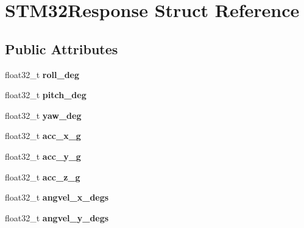 \hypertarget{struct_s_t_m32_response}{}\section{S\+T\+M32\+Response Struct Reference}
\label{struct_s_t_m32_response}
\subsection*{Public Attributes}
\begin{DoxyCompactItemize}
\item 
\mbox{\label{struct_s_t_m32_response_ac444797479ec9155bb8c2dd482b10e08}} 
float32\+\_\+t {\bfseries roll\+\_\+deg}
\item 
\mbox{\label{struct_s_t_m32_response_a7a161dc6f5e1e33a64f2bcd081f414ee}} 
float32\+\_\+t {\bfseries pitch\+\_\+deg}
\item 
\mbox{\label{struct_s_t_m32_response_a795f8edfc89cfc24224761c7ea378faa}} 
float32\+\_\+t {\bfseries yaw\+\_\+deg}
\item 
\mbox{\label{struct_s_t_m32_response_af165e1e563c6d281eb09433c5825c244}} 
float32\+\_\+t {\bfseries acc\+\_\+x\+\_\+g}
\item 
\mbox{\label{struct_s_t_m32_response_aa79868e6f2c7f54d7748dab2ec030eac}} 
float32\+\_\+t {\bfseries acc\+\_\+y\+\_\+g}
\item 
\mbox{\label{struct_s_t_m32_response_aee6c9f7f3ecd514934b262975ca78ac3}} 
float32\+\_\+t {\bfseries acc\+\_\+z\+\_\+g}
\item 
\mbox{\label{struct_s_t_m32_response_af52b3d414c4028021edf529e103d16a8}} 
float32\+\_\+t {\bfseries angvel\+\_\+x\+\_\+degs}
\item 
\mbox{\label{struct_s_t_m32_response_ae0c9e83b4a467d02331c9f892b8249ce}} 
float32\+\_\+t {\bfseries angvel\+\_\+y\+\_\+degs}
\item 
\mbox{\label{struct_s_t_m32_response_a03be1cc2d09af44d99a666b42becb1fa}} 

\end{DoxyCompactItemize}
